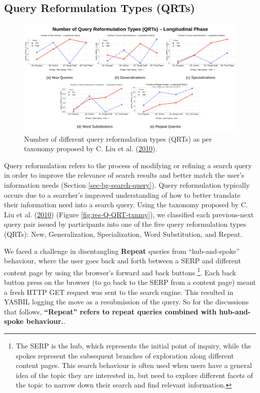 \documentclass[letterpaper, nobind]{templates/ociamthesis}
\begin{document}
\hypertarget{query-reformulation-types-qrts}{%
\subsection{Query Reformulation Types (QRTs)}\label{query-reformulation-types-qrts}}

\begin{figure}

{\centering \includegraphics[width=1\linewidth]{figs/rp2-qrt} 

}

\caption[Query reformulation counts for longitudinal phase.]{Number of different query reformulation types (QRTs) as per taxonomy proposed by C. Liu et al. (\protect\hyperlink{ref-liu2010analysis}{2010}).}\label{fig:rp2-qrt}
\end{figure}





Query reformulation refers to the process of modifying or refining a search query in order to improve the relevance of search results and better match the user's information needs (Section \ref{sec-bg-search-query}).
Query reformulation typically occurs due to a searcher's improved understanding of how to better translate their information need into a search query.
Using the taxonomy proposed by C. Liu et al. (\protect\hyperlink{ref-liu2010analysis}{2010}) (Figure \ref{fig:res-Q-QRT-txnmy}), we classified each previous-next query pair issued by participants into one of the five query reformulation types (QRTs):
New,
Generalization,
Specialization,
Word Substitution,
and
Repeat.

We faced a challenge in disentangling \textbf{Repeat} queries from ``hub-and-spoke'' behaviour, where the user goes back and forth between a SERP and different content page by using the browser's forward and back buttons \footnote{The SERP is the hub, which represents the initial point of inquiry, while the spokes represent the subsequent branches of exploration along different content pages. This search behaviour is often used when users have a general idea of the topic they are interested in, but need to explore different facets of the topic to narrow down their search and find relevant information.}.
Each back button press on the browser (to go back to the SERP from a content page) meant a fresh HTTP GET request was sent to the search engine.
This resulted in YASBIL logging the move as a resubmission of the query.
So for the discussions that follows, \textbf{``Repeat'' refers to repeat queries combined with hub-and-spoke behaviour.}.
\end{document}
